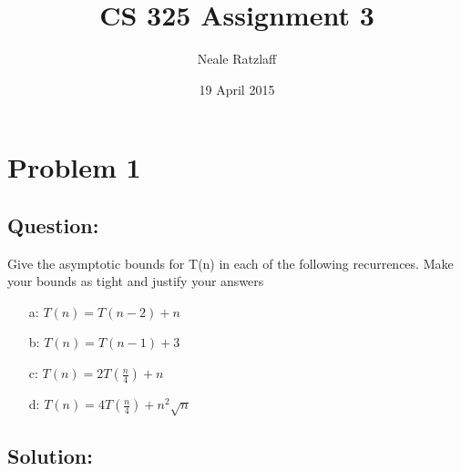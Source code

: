 \documentclass[12pt]{article}
\title{CS 325 Assignment 3}
\author{Neale Ratzlaff}
\date{19 April 2015}
\begin{document}
\maketitle
\pagebreak

\section{Problem 1}

  \subsection{Question:}
    Give the asymptotic bounds for T(n) in each of the following recurrences. Make your bounds as tight and justify your answers    
    \begin{itemize}
      \item[a:] $ T(n) = T(n-2) + n $
      \item[b:] $ T(n) = T(n-1) + 3 $
      \item[c:] $ T(n) = 2T(\frac{n}{4}) + n$
      \item[d:] $ T(n) = 4T(\frac{n}{4}) + n^2\sqrt{n} $
    \end{itemize}
 
  \subsection{Solution:}
\end{document}
